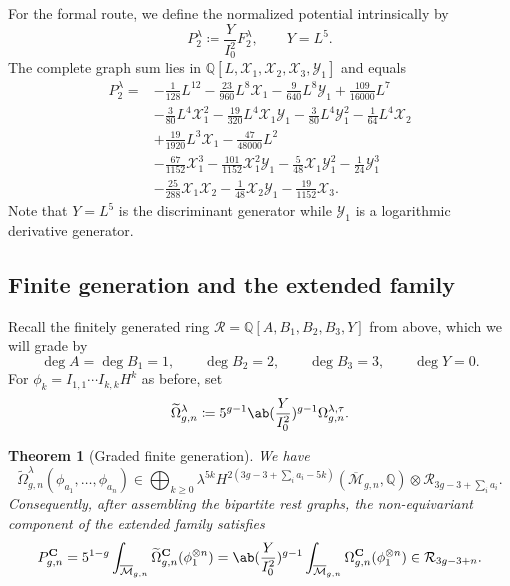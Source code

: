 \documentclass{amsart}
\newtheorem{thm}{Theorem}[section]
\theoremstyle{definition}
\theoremstyle{remark}
\theoremstyle{plain}
\theoremstyle{definition}
\theoremstyle{remark}
\newcommand{\Q}{\mathbb{Q}}
\newcommand{\Mbar}{\overline{\mathcal{M}}}
\newcommand{\mc}[1]{\mathcal{#1}}
\newcommand{\mbf}[1]{\mathbf{#1}}
\newcommand{\wt}[1]{\widetilde{#1}}
\newcommand{\1}{\mathbf{1}}
\newcommand{\2}{\mathbf{2}}
\newcommand{\3}{\mathbf{3}}
\begin{document}
For the formal route, we define the normalized potential intrinsically by
\[ P_2^{\lambda} \coloneqq \frac{Y}{I_0^2}F_2^{\lambda}, \qquad Y = L^5. \]
The complete graph sum lies in \(\Q[L,\mc{X}_1,\mc{X}_2,\mc{X}_3,\mc{Y}_1]\) and equals
\begin{align*}
    P_2^{\lambda} ={}& -\frac{1}{128}L^{12} - \frac{23}{960}L^8\mc{X}_1 - \frac{9}{640}L^8\mc{Y}_1 + \frac{109}{16000}L^7 \\
    &- \frac{3}{80}L^4\mc{X}_1^2 - \frac{19}{320}L^4\mc{X}_1\mc{Y}_1 - \frac{3}{80}L^4\mc{Y}_1^2 - \frac{1}{64}L^4\mc{X}_2 \\
    &+ \frac{19}{1920}L^3\mc{X}_1 - \frac{47}{48000}L^2 \\
    &- \frac{67}{1152}\mc{X}_1^3 - \frac{101}{1152}\mc{X}_1^2\mc{Y}_1 - \frac{5}{48}\mc{X}_1\mc{Y}_1^2 - \frac{1}{24}\mc{Y}_1^3 \\
    &- \frac{25}{288}\mc{X}_1\mc{X}_2 - \frac{1}{48}\mc{X}_2\mc{Y}_1 - \frac{19}{1152}\mc{X}_3.
\end{align*}
Note that \(Y = L^5\) is the discriminant generator while \(\mc{Y}_1\) is a logarithmic derivative generator.

\subsection{Finite generation and the extended family}%
\label{sub:Finite generation and the extended family}

Recall the finitely generated ring \(\mc{R} = \Q[A,B_1,B_2,B_3,Y]\) from above, which we will grade by
\[ \deg A = \deg B_1 = 1, \qquad \deg B_2 = 2, \qquad \deg B_3 = 3, \qquad \deg Y = 0. \]
For \(\phi_k = I_{1,1}\cdots I_{k,k}H^k\) as before, set
\[ \wt{\Omega}^{\lambda}_{g,n} \coloneqq 5^{g-1}\ab(\frac{Y}{I_0^2})^{g-1}\Omega^{\lambda,\tau}_{g,n}. \]

\begin{thm}[Graded finite generation]%
\label{thm:graded finite generation}
    We have
    \[ \wt{\Omega}^{\lambda}_{g,n}(\phi_{a_1}, \ldots, \phi_{a_n}) \in \bigoplus_{k \geq 0}\lambda^{5k}H^{2(3g-3+\sum_i a_i - 5k)}(\Mbar_{g,n},\Q)\otimes \mc{R}_{3g-3+\sum_i a_i}. \]
    Consequently, after assembling the bipartite rest graphs, the non-equivariant component of the extended family satisfies
    \[ P^{\mbf{C}}_{g,n} = 5^{1-g}\int_{\Mbar_{g,n}}\wt{\Omega}^{\mbf{C}}_{g,n}(\phi_1^{\otimes n}) = \ab( \frac{Y}{I_0^2})^{g-1}\int_{\Mbar_{g,n}}\Omega^{\mbf{C}}_{g,n}(\phi_1^{\otimes n}) \in \mc{R}_{3g-3+n}. \]
\end{thm}
\end{document}
